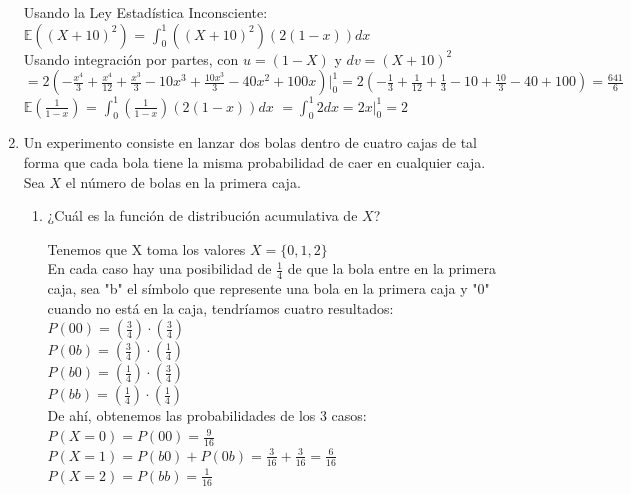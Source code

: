 \documentclass[12pt,a4paper]{report}
\begin{document}
\begin{enumerate}
{			Usando la Ley Estadística Inconsciente:\\

			$\mathbb{E}((X+10)^2)$ = $\int_{0}^{1}((X+10)^2)(2(1-x))dx$\\
			Usando integración por partes, con $u = (1-X)$ y $dv = (X+10)^2$\\
			$= 2(-\frac{x^4}{3} + \frac{x^4}{12} + \frac{x^3}{3} - 10x^3 + \frac{10x^3}{3} - 40x^2 + 100x)\Big|_{0}^{1} = 2(-\frac{1}{3} + \frac{1}{12} + \frac{1}{3} - 10 + \frac{10}{3} - 40 + 100) = \frac{641}{6}$\\

			$\mathbb{E}(\frac{1}{1-x})$ = $\int_{0}^{1}(\frac{1}{1-x})(2(1-x))dx$
			$= \int_{0}^{1}2dx = 2x\Big|_{0}^{1} = 2$\\

		}

		\item{
			Un experimento consiste en lanzar dos bolas dentro de cuatro cajas
			de tal forma que cada bola tiene la misma probabilidad de caer en
			cualquier caja. Sea $X$ el número de bolas en la primera caja.
			\begin{enumerate}
				\item {
					¿Cuál es la función de distribución acumulativa de $X$?

					Tenemos que X toma los valores $X = \{0,1,2\}$\\

					En cada caso hay una posibilidad de $\frac{1}{4}$ de que la bola entre en la primera caja, sea "b" el símbolo que represente una bola en la primera caja y "0" cuando no está en la caja, tendríamos cuatro resultados:\\

					$P(00) = (\frac{3}{4})\cdot(\frac{3}{4})$\\
					$P(0b) = (\frac{3}{4})\cdot(\frac{1}{4})$\\
					$P(b0) = (\frac{1}{4})\cdot(\frac{3}{4})$\\
					$P(bb) = (\frac{1}{4})\cdot(\frac{1}{4})$\\

					De ahí, obtenemos las probabilidades de los 3 casos:\\

					$P(X=0) = P(00) = \frac{9}{16}$\\
					$P(X=1) = P(b0) + P(0b) = \frac{3}{16} + \frac{3}{16} = \frac{6}{16}$\\
					$P(X=2) = P(bb) = \frac{1}{16}$\\

}
\end{enumerate}}
\end{enumerate}
\end{document}
